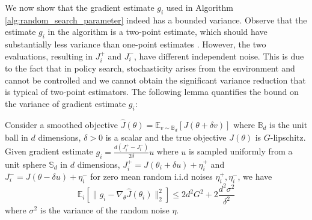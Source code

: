 We now show that the gradient estimate $g_i$ used in Algorithm
\ref{alg:random_search_parameter} indeed has a bounded variance. Observe that
the estimate $g_i$ in the algorithm is a two-point estimate, which
should have substantially less variance than one-point
estimates \citep{agarwal2010optimal}. However, the two evaluations, resulting in $J_i^+$ and
$J_i^-$, have different independent noise. This is due to the
fact that in policy search, stochasticity arises from the
environment and cannot be controlled and we cannot obtain the
significant variance reduction that is typical of two-point
estimators. The following lemma quantifies the bound on the variance of
gradient estimate $g_i$:
\begin{lemma}
\label{lemma:grad-variance-parameter}
  Consider a smoothed objective $\hat{J}(\theta) = \mathbb{E}_{v \sim
    \mathbb{B}_d}[J(\theta + \delta v)]$ where $\mathbb{B}_d$ is the
  unit ball in $d$ dimensions, $\delta > 0$ is a scalar and the true
  objective $J(\theta)$ is $G$-lipschitz. Given gradient estimate $g_i
  = \frac{d(J_i^+ - J_i^-)}{2\delta}u$ where $u$ is sampled uniformly
  from a unit sphere $\mathbb{S}_d$ in $d$ dimensions, $J^+_i =
  J(\theta_i + \delta u) + \eta^+_i$ and $J_i^- = J(\theta - \delta u)
  + \eta_i^-$ for zero mean random i.i.d noises $\eta_i^+, \eta_i^-$, we have
  \begin{equation}
    \label{eq:grad-variance-parameter}
    \mathbb{E}_i[\|g_i - \nabla_\theta \hat{J}(\theta_i)\|_2^2] \leq
    2d^2G^2 + 2\frac{d^2\sigma^2}{\delta^2}
  \end{equation}
  where {$\sigma^2$ is the variance of the random noise $\eta$.}
\end{lemma}


